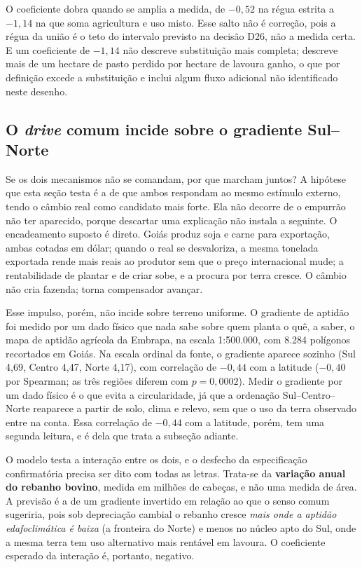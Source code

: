 O coeficiente dobra quando se amplia a medida, de $-0{,}52$ na régua estrita a
$-1{,}14$ na que soma agricultura e uso misto. Esse salto não é correção, pois a
régua da união é o teto do intervalo previsto na decisão D26, não a medida
certa. E um coeficiente de $-1{,}14$ não descreve substituição mais completa;
descreve mais de um hectare de pasto perdido por hectare de lavoura ganho, o
que por definição excede a substituição e inclui algum fluxo adicional não
identificado neste desenho.

\subsection{O \emph{drive} comum incide sobre o gradiente Sul--Norte}

Se os dois mecanismos não se comandam, por que marcham juntos? A hipótese que
esta seção testa é a de que ambos respondam ao mesmo estímulo externo, tendo o
câmbio real como candidato mais forte. Ela não decorre de o empurrão não ter
aparecido, porque descartar uma explicação não instala a seguinte. O
encadeamento suposto é direto. Goiás produz soja e carne para exportação, ambas
cotadas em dólar; quando o real se desvaloriza, a mesma tonelada exportada
rende mais reais ao produtor sem que o preço internacional mude; a
rentabilidade de plantar e de criar sobe, e a procura por terra cresce. O
câmbio não cria fazenda; torna compensador avançar.

Esse impulso, porém, não incide sobre terreno uniforme. O gradiente de aptidão
foi medido por um dado físico que nada sabe sobre quem planta o quê, a saber,
o mapa de aptidão agrícola da Embrapa, na escala 1:500.000, com 8.284
polígonos recortados em Goiás. Na escala ordinal da fonte, o gradiente aparece
sozinho (Sul 4,69, Centro 4,47, Norte 4,17), com correlação de $-0{,}44$ com a
latitude ($-0{,}40$ por Spearman; as três regiões diferem com $p = 0{,}0002$).
Medir o gradiente por um dado físico é o que evita a circularidade, já que a ordenação
Sul--Centro--Norte reaparece a partir de solo, clima e relevo, sem que o uso da
terra observado entre na conta. Essa correlação de $-0{,}44$ com a latitude,
porém, tem uma segunda leitura, e é dela que trata a subseção adiante.

O modelo testa a interação entre os dois, e o desfecho da especificação
confirmatória precisa ser dito com todas as letras. Trata-se da
\textbf{variação anual do rebanho bovino}, medida em milhões de cabeças, e não
uma medida de área. A previsão é a de um gradiente invertido em relação ao que
o senso comum sugeriria, pois sob depreciação cambial o rebanho cresce \emph{mais
onde a aptidão edafoclimática é baixa} (a fronteira do Norte) e menos no
núcleo apto do Sul, onde a mesma terra tem uso alternativo mais rentável em
lavoura. O coeficiente esperado da interação é, portanto, negativo.

